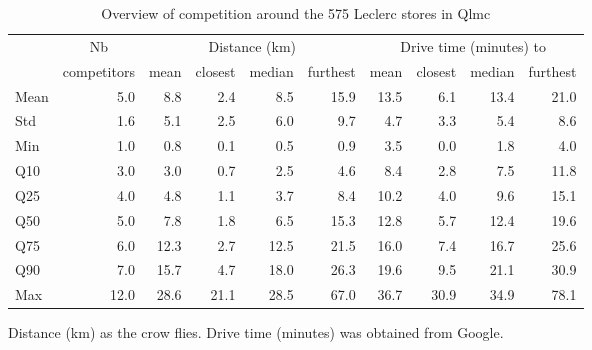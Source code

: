 \documentclass[english]{article}
\begin{document}
\begin{table}
\begin{threeparttable}
\caption{Overview of competition around the 575 Leclerc stores in Qlmc}
\label{tab:qlmc_comp}
\begin{tabular}{lr|rrrr|rrrr}
    \toprule
    \toprule
          & \multicolumn{1}{c|}{Nb} & \multicolumn{4}{c|}{Distance (km)} & \multicolumn{4}{c}{Drive time (minutes) to} \\
          & \multicolumn{1}{c|}{competitors} & \multicolumn{1}{c}{mean} & \multicolumn{1}{c}{closest} & \multicolumn{1}{c}{median} & \multicolumn{1}{c|}{furthest} & \multicolumn{1}{c}{mean} & \multicolumn{1}{c}{closest} & \multicolumn{1}{c}{median} & \multicolumn{1}{c}{furthest} \\
    \midrule
    Mean  & 5.0   & 8.8   & 2.4   & 8.5   & 15.9  & 13.5  & 6.1   & 13.4  & 21.0 \\
    Std   & 1.6   & 5.1   & 2.5   & 6.0   & 9.7   & 4.7   & 3.3   & 5.4   & 8.6 \\
    Min   & 1.0   & 0.8   & 0.1   & 0.5   & 0.9   & 3.5   & 0.0   & 1.8   & 4.0 \\
    Q10   & 3.0   & 3.0   & 0.7   & 2.5   & 4.6   & 8.4   & 2.8   & 7.5   & 11.8 \\
    Q25   & 4.0   & 4.8   & 1.1   & 3.7   & 8.4   & 10.2  & 4.0   & 9.6   & 15.1 \\
    Q50   & 5.0   & 7.8   & 1.8   & 6.5   & 15.3  & 12.8  & 5.7   & 12.4  & 19.6 \\
    Q75   & 6.0   & 12.3  & 2.7   & 12.5  & 21.5  & 16.0  & 7.4   & 16.7  & 25.6 \\
    Q90   & 7.0   & 15.7  & 4.7   & 18.0  & 26.3  & 19.6  & 9.5   & 21.1  & 30.9 \\
    Max   & 12.0  & 28.6  & 21.1  & 28.5  & 67.0  & 36.7  & 30.9  & 34.9  & 78.1 \\
    \bottomrule
    \bottomrule
\end{tabular}
\begin{tablenotes}
\small
\item Distance (km) as the crow flies. Drive time (minutes) was obtained from Google.
\end{tablenotes}
\end{threeparttable}
\end{table}
\end{document}
